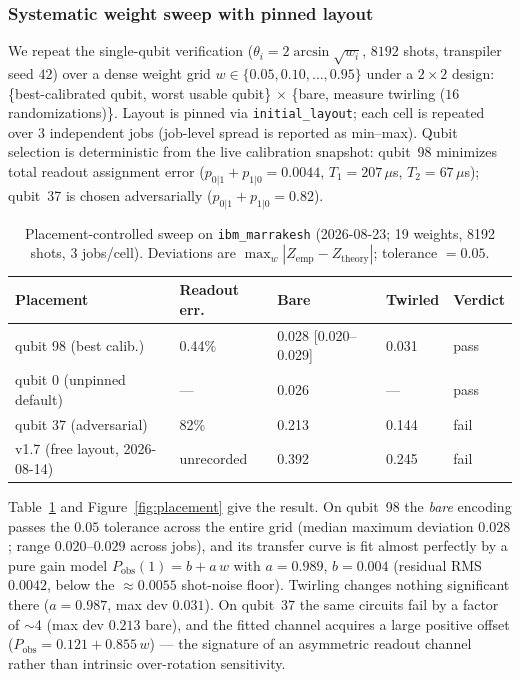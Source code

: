 ﻿\documentclass[12pt,a4paper]{article}
\begin{document}
\subsubsection{Systematic weight sweep with pinned layout}\label{sec:sweep}

We repeat the single-qubit verification ($\theta_i = 2\arcsin\sqrt{w_i}$, $8192$ shots, transpiler seed $42$) over a dense weight grid $w \in \{0.05, 0.10, \ldots, 0.95\}$ under a $2\times 2$ design: \{best-calibrated qubit, worst usable qubit\} $\times$ \{bare, measure twirling ($16$ randomizations)\}. Layout is pinned via \texttt{initial\_layout}; each cell is repeated over $3$ independent jobs (job-level spread is reported as min--max). Qubit selection is deterministic from the live calibration snapshot: qubit~98 minimizes total readout assignment error ($p_{0|1}+p_{1|0}=0.0044$, $T_1=207\,\mu$s, $T_2=67\,\mu$s); qubit~37 is chosen adversarially ($p_{0|1}+p_{1|0}=0.82$).

\begin{table}[H]
\centering
\caption{Placement-controlled sweep on \texttt{ibm\_marrakesh} (2026-08-23; 19 weights, 8192 shots, 3 jobs/cell). Deviations are $\max_w |Z_{\mathrm{emp}} - Z_{\mathrm{theory}}|$; tolerance $=0.05$.}
\label{tab:placement}
\small
\begin{tabular}{@{}lllll@{}}
\toprule
Placement & Readout err. & Bare & Twirled & Verdict \\
\midrule
qubit 98 (best calib.) & 0.44\% & 0.028 [0.020--0.029] & 0.031 & pass \\
qubit 0 (unpinned default) & --- & 0.026 & --- & pass \\
qubit 37 (adversarial) & 82\% & 0.213 & 0.144 & fail \\
v1.7 (free layout, 2026-08-14) & unrecorded & 0.392 & 0.245 & fail \\
\bottomrule
\end{tabular}
\end{table}

Table~\ref{tab:placement} and Figure~\ref{fig:placement} give the result. On qubit~98 the \emph{bare} encoding passes the $0.05$ tolerance across the entire grid (median maximum deviation $0.028$; range $0.020$--$0.029$ across jobs), and its transfer curve is fit almost perfectly by a pure gain model $P_{\mathrm{obs}}(1) = b + a\,w$ with $a = 0.989$, $b = 0.004$ (residual RMS $0.0042$, below the $\approx 0.0055$ shot-noise floor). Twirling changes nothing significant there ($a=0.987$, max dev $0.031$). On qubit~37 the same circuits fail by a factor of $\sim$4 (max dev $0.213$ bare), and the fitted channel acquires a large positive offset ($P_{\mathrm{obs}} = 0.121 + 0.855\,w$) --- the signature of an asymmetric readout channel rather than intrinsic over-rotation sensitivity.
\end{document}

